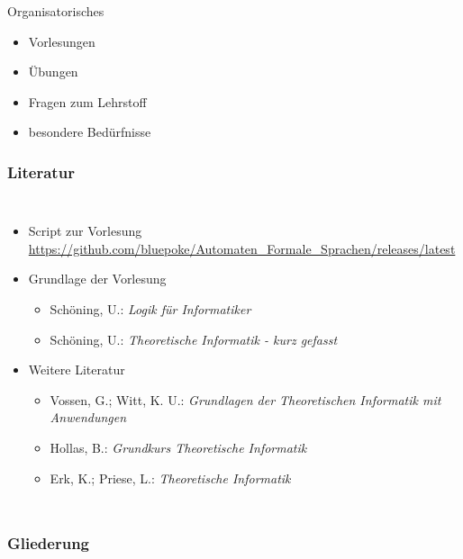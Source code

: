 \begin{frame}
	\titlepage
\end{frame}


\begin{frame}{Organisatorisches}
	\begin{itemize}
		\item Vorlesungen
		\item Übungen
		\item Fragen zum Lehrstoff
		\item besondere Bedürfnisse
	\end{itemize}
\end{frame}

\AtBeginSection{
	\begin{frame}
		\sectionpage
		\tableofcontents[sectionstyle=hide/hide,subsectionstyle=show/show/hide]
	\end{frame}
}

\begin{frame}
	\frametitle{Literatur}
	\begin{columns}
			\begin{itemize}
				\item Script zur Vorlesung \\
				{\small \url{https://github.com/bluepoke/Automaten_Formale_Sprachen/releases/latest}}
				\item Grundlage der Vorlesung
				\begin{itemize}
					\item Schöning, U.: \textit{Logik für Informatiker}
					\item Schöning, U.: \textit{Theoretische Informatik - kurz gefasst}
				\end{itemize}
				\item Weitere Literatur
				\begin{itemize}
					\item Vossen, G.; Witt, K. U.: \textit{Grundlagen der Theoretischen Informatik mit Anwendungen}
					\item Hollas, B.: \textit{Grundkurs Theoretische Informatik}
					\item Erk, K.;  Priese, L.: \textit{Theoretische Informatik}
				\end{itemize}
			\end{itemize}
	\end{columns}
\end{frame}

\begin{frame}
	\frametitle{Gliederung}
	\tableofcontents
\end{frame}